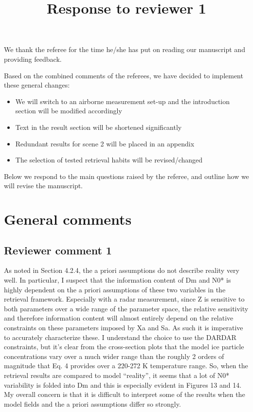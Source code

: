 \documentclass[11pt]{scrartcl}
\title{Response to reviewer 1}
\date{}
\begin{document}
\maketitle

\setlength{\parindent}{0cm}

We thank the referee for the time he/she has put on reading our manuscript and providing
feedback.

Based on the combined comments of the referees, we have decided to implement these general
changes:

\begin{itemize}
\item We will switch to an airborne measurement set-up and
  the introduction section will be modified accordingly
\item Text in the result section will be shortened significantly
\item Redundant results for scene 2 will be placed in an appendix
\item The selection of tested retrieval habits will be revised/changed
\end{itemize}

Below we respond to the main questions raised by the referee, and outline how we will
revise the manuscript.

\section{General comments}

\subsection*{Reviewer comment 1}

As noted in Section 4.2.4, the a priori assumptions do not describe reality very
well. In particular, I suspect that the information content of Dm and N0* is
highly dependent on the a priori assumptions of these two variables in the
retrieval framework. Especially with a radar measurement, since Z is sensitive
to both parameters over a wide range of the parameter space, the relative
sensitivity and therefore information content will almost entirely depend on the
relative constraints on these parameters imposed by Xa and Sa. As such it is
imperative to accurately characterize these. I understand the choice to use the
DARDAR constraints, but it’s clear from the cross-section plots that the model
ice particle concentrations vary over a much wider range than the roughly 2
orders of magnitude that Eq. 4 provides over a 220-272 K temperature range. So,
when the retrieval results are compared to model “reality”, it seems that a lot
of N0* variability is folded into Dm and this is especially evident in Figures
13 and 14. My overall concern is that it is difficult to interpret some of the
results when the model fields and the a priori assumptions differ so strongly.
\end{document}
